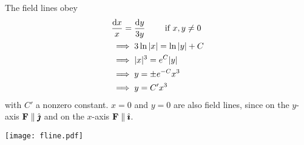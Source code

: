 \begin{solution} 
 The field lines obey
\begin{align*}
&\frac{\mathrm{d}x}{x}=\frac{\mathrm{d}y}{3y}\qquad\text{ if $x,y\ne 0$}\\
&\implies 3\ln |x|=\ln |y|+C\\
&\implies |x|^3=e^C|y| \\
&\implies y=\pm e^{-C}x^3 \\
&\implies y=C'x^3
\end{align*}
with $C'$ a nonzero constant.
$x=0$ and $y=0$ are also field lines,
since on the $y$-axis $\mathbf{F}\parallel\hat{\pmb{\jmath}}$ and
on the $x$-axis $\mathbf{F}\parallel\hat{\pmb{\imath}}$.

\begin{center}
   \texttt{[image: fline.pdf]}
\end{center}
\end{solution}





